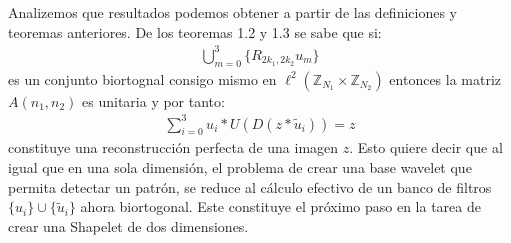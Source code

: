 \par Analizemos que resultados podemos obtener a partir de las definiciones y teoremas anteriores. De los teoremas 1.2 y 1.3 se sabe que si:
\begin{eqnarray}
\bigcup_{m=0}^{3}\{R_{2k_1,2k_2}u_m\}\nonumber
\end{eqnarray}
es un conjunto biortognal consigo mismo en $\ell^2(\mathbb{Z}_{N_1}\times\mathbb{Z}_{N_2})$ entonces la matriz $A(n_1,n_2)$ es unitaria y por tanto:
\begin{eqnarray}
\sum_{i=0}^3 u_i\ast U(D(z\ast\tilde{u}_i))=z\nonumber
\end{eqnarray}
constituye una reconstrucci\'on perfecta de una imagen $z$. Esto quiere decir que al igual que en una sola dimensi\'on, el problema de crear una base wavelet que permita detectar un patr\'on, se reduce al c\'alculo efectivo de un banco de filtros $\{u_i\}\cup\{\tilde{u}_i\}$ ahora biortogonal. Este constituye el pr\'oximo paso en la tarea de crear una Shapelet de dos dimensiones.\\